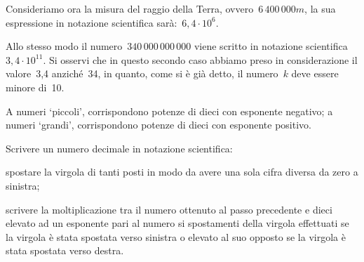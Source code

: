 Consideriamo ora la misura del raggio della Terra, 
ovvero~\(6\,400\,000\unit{m}\),
la sua espressione in notazione scientifica sarà:~\(6,4\cdot10^6\).

Allo stesso modo il numero~\(340\,000\,000\,000\) viene scritto in notazione 
scientifica~\(3,4\cdot10^{11}\).
Si osservi che in questo secondo caso abbiamo preso in considerazione il 
valore~3,4 anziché~34, in quanto, come si è già detto, il numero~\(k\) deve 
essere minore di~10.

\osservazione A numeri `piccoli', corrispondono potenze di dieci con 
esponente negativo; 
a numeri `grandi', corrispondono potenze di dieci con esponente positivo.

\begin{procedura}
Scrivere un numero decimale in notazione scientifica:
\begin{enumeratea} %
 \item spostare la virgola di tanti posti in modo da avere una sola cifra
  diversa da zero a sinistra;
 \item scrivere la moltiplicazione tra il numero ottenuto al passo 
precedente
  e dieci elevato ad un esponente pari al numero si spostamenti della 
virgola 
  effettuati se la virgola è stata spostata verso sinistra o elevato al suo 
  opposto se la virgola è stata spostata verso destra.
\end{enumeratea}
\end{procedura}

